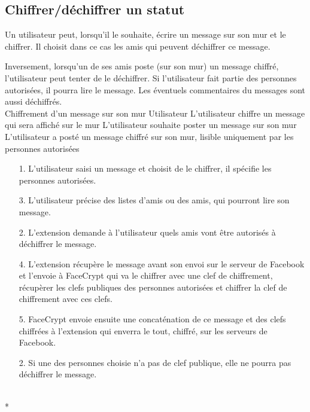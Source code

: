 \documentclass[a4paper,11pt,french]{article}
\begin{document}
\subsection{Chiffrer/déchiffrer un statut}
Un utilisateur peut, lorsqu'il le souhaite, écrire un message
sur son mur et le chiffrer. Il choisit dans ce cas les amis
qui peuvent déchiffrer ce message.

Inversement, lorsqu'un de ses amis poste (sur son mur) un message chiffré,
l'utilisateur peut tenter de le déchiffrer. Si l'utilisateur
fait partie des personnes autorisées, il pourra lire le message.
Les éventuels commentaires du messages sont aussi déchiffrés.\\

\fiche
	{Chiffrement d'un message sur son mur}
	{Utilisateur}
	{L'utilisateur chiffre un message qui sera affiché sur le mur}
	{}
	{L'utilisateur souhaite poster un message sur son mur}
	{L'utilisateur a posté un message chiffré sur son mur, lisible uniquement par les personnes autorisées}
	{\begin{itemize}
	    \item[]
	  \item[1.] L'utilisateur saisi un message et choisit de le chiffrer,
          il spécifie les personnes autorisées.
      \item[3.] L'utilisateur précise des listes d'amis ou des amis, 
          qui pourront lire son message.
	\end{itemize}
	}
	{\begin{itemize}
        \item[]
        \item[2.] L'extension demande à l'utilisateur quels amis vont être
            autorisés à déchiffrer le message.
		\item[4.] L'extension récupère le message avant son envoi sur le serveur 
            de Facebook et l'envoie à FaceCrypt qui va le chiffrer avec une clef 
        de chiffrement, récupèrer les clefs publiques des personnes autorisées 
        et chiffrer la clef de chiffrement avec ces clefs.
		\item[5.] FaceCrypt envoie ensuite une concaténation de 
        ce message et des clefs chiffrées à l'extension qui enverra le tout,
        chiffré, sur les serveurs de Facebook.
	\end{itemize}
    }
	{}
\flots
    {}
    {\begin{itemize}
    \item[]
    \item[2.] Si une des personnes choisie n'a pas de clef publique,
        elle ne pourra pas déchiffrer le message.
    \end{itemize}
    }
    {}
\\*
\end{document}
